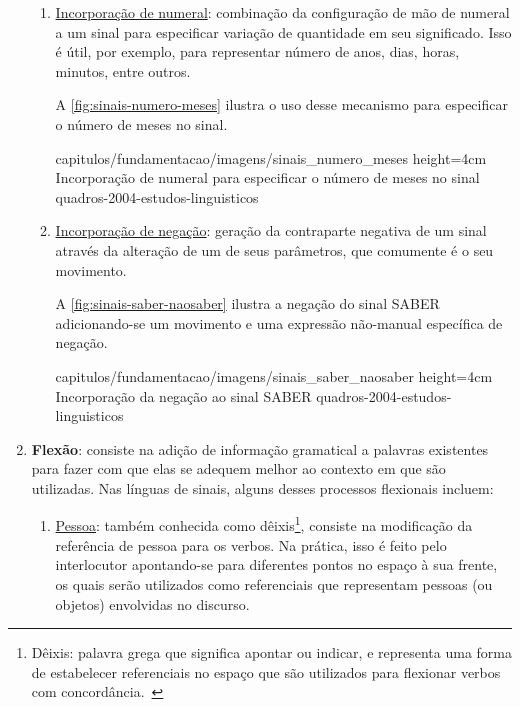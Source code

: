 \begin{enumerate}
\begin{enumerate}
              \item \underline{Incorporação de numeral}: combinação da configuração de mão de numeral a um sinal para especificar variação de quantidade em seu significado. Isso é útil, por exemplo, para representar número de anos, dias, horas, minutos, entre outros.

                    A \autoref{fig:sinais-numero-meses} ilustra o uso desse mecanismo para especificar o número de meses no sinal.

                    {capitulos/fundamentacao/imagens/sinais_numero_meses} %
                    {height=4cm} %
                    {Incorporação de numeral para especificar o número de meses no sinal} %
                    {quadros-2004-estudos-linguisticos} %



              \item \underline{Incorporação de negação}: geração da contraparte negativa de um sinal através da alteração de um de seus parâmetros, que comumente é o seu movimento.

                    A \autoref{fig:sinais-saber-naosaber} ilustra a negação do sinal SABER adicionando-se um movimento e uma expressão não-manual específica de negação.

                    {capitulos/fundamentacao/imagens/sinais_saber_naosaber} %
                    {height=4cm} %
                    {Incorporação da negação ao sinal SABER} %
                    {quadros-2004-estudos-linguisticos} %

          \end{enumerate}


    \item \textbf{Flexão}: consiste na adição de informação gramatical a palavras existentes para fazer com que elas se adequem melhor ao contexto em que são utilizadas. Nas línguas de sinais, alguns desses processos flexionais incluem:

          \begin{enumerate}
              \item \underline{Pessoa}: também conhecida como dêixis\footnote{
                        Dêixis: palavra grega que significa apontar ou indicar, e representa uma forma de estabelecer referenciais no espaço que são utilizados para flexionar verbos com concordância.~\cite{quadros-2004-estudos-linguisticos}
                    }, consiste na modificação da referência de pessoa para os verbos.
                    Na prática, isso é feito pelo interlocutor apontando-se para diferentes pontos no espaço à sua frente, os quais serão utilizados como referenciais que representam pessoas (ou objetos) envolvidas no discurso.


\end{enumerate}
\end{enumerate}

